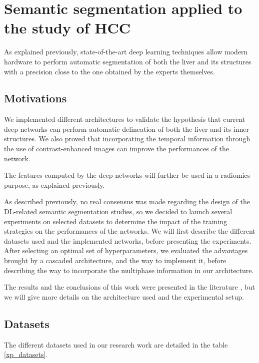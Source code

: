 \documentclass[]{article}
\begin{document}
	
	\section*{Semantic segmentation applied to the study of HCC}
	
	As explained previously, state-of-the-art deep learning techniques allow
	modern hardware to perform automatic segmentation of both the liver and
	its structures with a precision close to the one obtained by the experts
	themselves.
	
	
	\subsection*{Motivations}
	
	We implemented different architectures to validate the hypothesis that
	current deep networks can perform automatic delineation of both the
	liver and its inner structures. We also proved that incorporating the temporal information through the use of contrast-enhanced images can improve the performances of the network.
	
	The features computed by the deep networks will further be used in a
	radiomics purpose, as explained previously.
	
	As described previously, no real consensus was made regarding the
	design of the DL-related semantic segmentation studies, so we decided to
	launch several experiments on selected datasets to determine the impact
	of the training strategies on the performances of the networks.
	We will first describe the different datasets used and the implemented
	networks, before presenting the experiments.
	After selecting an optimal set of hyperparameters, we evaluated the
	advantages brought by a cascaded architecture, and the way to implement
	it, before describing the way to incorporate the multiphase information
	in our architecture.
	
	The results and the conclusions of this work were presented in the
	literature \cite{Ouhmich2019}, but we will give more details on the
	architecture used and the experimental setup.
	
	
	
	\subsection*{Datasets}
	
	The different datasets used in our research work are detailed in the
	table \ref{xp_datasets}.
	
\end{document}
